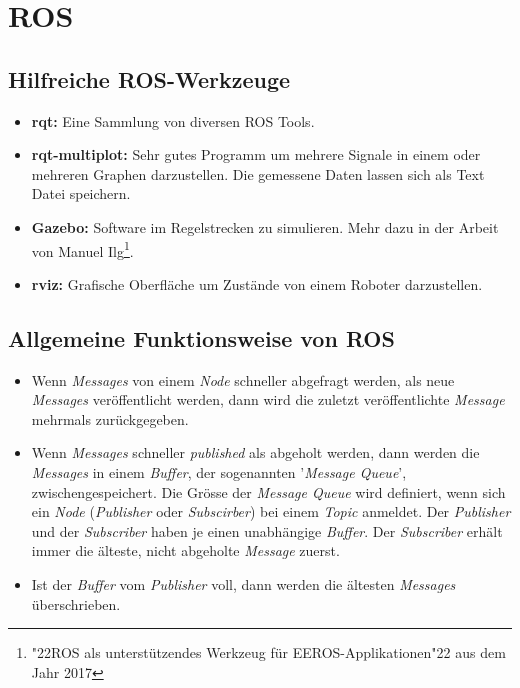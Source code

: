 \chapter{ROS}
\label{chapter:ros}

\section{Hilfreiche ROS-Werkzeuge}

\begin{itemize}
\item \textbf{rqt:} Eine Sammlung von diversen ROS Tools.
\item \textbf{rqt-multiplot:} Sehr gutes Programm um mehrere Signale in einem oder mehreren Graphen darzustellen. Die gemessene Daten lassen sich als Text Datei speichern.
\item \textbf{Gazebo:} Software im Regelstrecken zu simulieren. Mehr dazu in der Arbeit von Manuel Ilg\footnote{\char"22ROS als unterstützendes Werkzeug für EEROS-Applikationen\char"22 aus dem Jahr 2017}.
\item \textbf{rviz:} Grafische Oberfläche um Zustände von einem Roboter darzustellen.
\end{itemize}


\section{Allgemeine Funktionsweise von ROS}

\begin{itemize}
\item Wenn \textit{Messages} von einem \textit{Node} schneller abgefragt werden, als neue \textit{Messages} veröffentlicht werden, dann wird die zuletzt veröffentlichte \textit{Message} mehrmals zurückgegeben.
\item Wenn \textit{Messages} schneller \textit{published} als abgeholt werden, dann werden die \textit{Messages} in einem \textit{Buffer}, der sogenannten '\textit{Message Queue}', zwischengespeichert. Die Grösse der \textit{Message Queue} wird definiert, wenn sich ein \textit{Node} (\textit{Publisher} oder \textit{Subscirber}) bei einem \textit{Topic} anmeldet. Der \textit{Publisher} und der \textit{Subscriber} haben je einen unabhängige \textit{Buffer}. Der \textit{Subscriber} erhält immer die älteste, nicht abgeholte \textit{Message} zuerst.
\item Ist der \textit{Buffer} vom \textit{Publisher} voll, dann werden die ältesten \textit{Messages} überschrieben.
\end{itemize}


